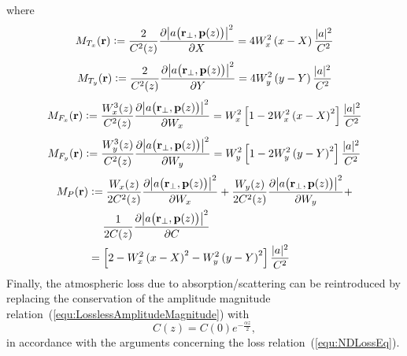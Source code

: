 \documentclass[9pt,twocolumn,twoside]{osajnl}
\newcommand\pder[2]{\frac{\partial #1}{\partial #2}}
\newcommand{\la}[1]{\label{#1}}
\newcommand{\pp}[2]{\frac{\partial #1}{\partial #2}}
\newcommand{\defeq}{\vcentcolon=}
\begin{document}
where 
\begin{equation*}
  M_{T_{x}}({\bf r}) \defeq \frac{2}{C^{2}(z)} \pder{\big| a\big( {\bf r}_{\perp}, {\bf p}(z) \big) \big|^{2}}{X}
  = 4 W_{x}^{2} \left( x - X \right) \frac{|a|^{2}}{C^{2}} 
\end{equation*}
\begin{equation*}
  M_{T_{y}}({\bf r}) \defeq \frac{2}{C^{2}(z)} \pp{\big| a\big( {\bf r}_{\perp}, {\bf p}(z) \big)\big|^{2}}{Y} 
   = 4 W_{y}^{2} \left( y - Y \right) \frac{|a|^{2}}{C^{2}} 
\end{equation*}
\begin{equation*}
  M_{F_{x}}({\bf r}) \defeq \frac{W_{x}^{3}(z)}{C^{2}(z)} \pp{\big| a\big( {\bf r}_{\perp}, {\bf p}(z) \big)\big|^{2}}{W_{x}}
   = W_{x}^{2} \left[ 1 - 2 W_{x}^{2} \left( x - X \right)^{2} \right] \frac{|a|^{2}}{C^{2}}  
\end{equation*}
\begin{equation*}
  M_{F_{y}}({\bf r}) \defeq \frac{W_{y}^{3}(z)}{C^{2}(z)} \pp{\big| a\big( {\bf r}_{\perp}, {\bf p}(z) \big)\big|^{2}}{W_{y}}
   = W_{y}^{2} \left[ 1 - 2 W_{y}^{2} \left( y - Y \right)^{2} \right] \frac{|a|^{2}}{C^{2}} 
\end{equation*}
\begin{equation*}
\begin{aligned}
   M_{P}({\bf r}) &\defeq \frac{W_{x}(z)}{2 C^{2}(z)} \pder{\big| a\big( {\bf r}_{\perp}, {\bf p}(z) \big)\big|^{2}}{W_{x}} + \frac{W_{y}(z)}{2 C^{2}(z)} \pder{\big| a\big( {\bf r}_{\perp}, {\bf p}(z) \big)\big|^{2}}{W_{y}} + \\
  & \hspace{13pt} \frac{1}{2 C(z)} \pder{\big| a\big( {\bf r}_{\perp}, {\bf p}(z) \big)\big|^{2}}{C} \\
   & = \left[ 2 - W_{x}^{2} \left( x - X \right)^{2} - W_{y}^{2} \left( y - Y \right)^{2} \right] \frac{|a|^{2}}{C^{2}} 
\end{aligned}
\end{equation*}
Finally, the atmospheric loss due to absorption/scattering can be reintroduced 
by replacing the conservation of the amplitude magnitude relation~(\ref{equ:LosslessAmplitudeMagnitude}) with
\begin{equation}\la{equ:LossAmplitudeMagnitude}
C(z) = C(0)e^{-\frac{\alpha z}{2}},
\end{equation}
in accordance with the arguments concerning the loss relation~(\ref{equ:NDLossEq}).  
\end{document}
